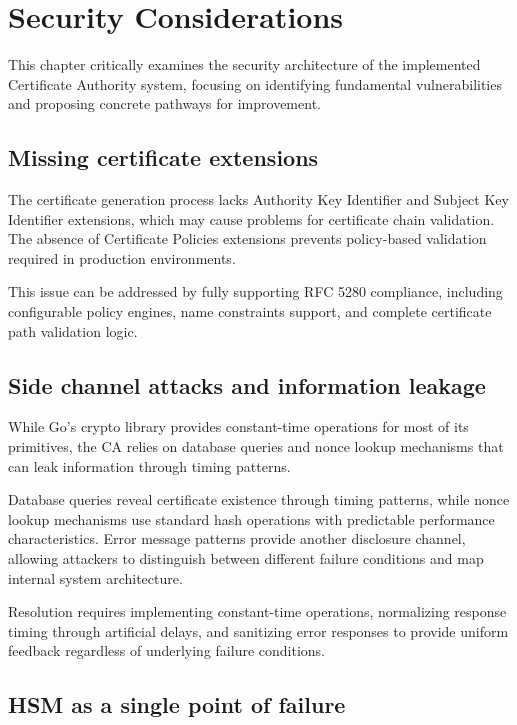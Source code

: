 \chapter{Security Considerations}

This chapter critically examines the security architecture of the implemented Certificate 
Authority system, focusing on identifying fundamental vulnerabilities and proposing 
concrete pathways for improvement.


\section{Missing certificate extensions}

The certificate generation process lacks Authority Key Identifier and Subject Key Identifier extensions,
which may cause problems for certificate chain validation. The absence of Certificate Policies extensions 
prevents policy-based validation required in production environments.

This issue can be addressed by fully supporting RFC 5280 \cite{rfc5280} compliance, 
including configurable policy engines, name constraints support, and complete certificate path 
validation logic.


\section{Side channel attacks and information leakage}

While Go's crypto library provides constant-time operations for most of its primitives, the CA
relies on database queries and nonce lookup mechanisms that can leak information through timing
patterns. 

Database queries reveal certificate existence through timing patterns, while nonce lookup mechanisms 
use standard hash operations with predictable performance characteristics. Error message patterns
provide another disclosure channel, allowing attackers to distinguish between different failure 
conditions and map internal system architecture.

Resolution requires implementing constant-time operations, normalizing response timing through 
artificial delays, and sanitizing error responses to provide uniform feedback regardless of underlying 
failure conditions.


\section{HSM as a single point of failure}

